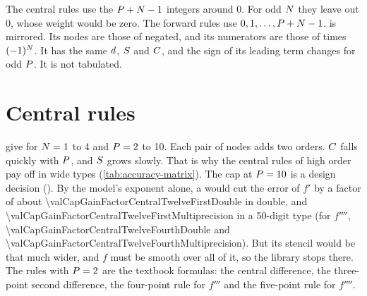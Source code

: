The central rules use the $P + N - 1$ integers around 0. For odd $N$ they leave out 0, whose weight
would be zero. The forward rules use $0, 1, \ldots, P + N - 1$.  is 
mirrored. Its nodes are those of  negated, and its numerators are those of  times
$(-1)^{N}$. It has the same $d$, $S$ and $C$, and the sign of its leading term changes for odd
$P$. It is not tabulated.

\section{Central rules}\label{sec:tables-central}

give  for $N = 1$ to 4 and $P = 2$ to 10. Each pair of nodes adds two orders. $C$
falls quickly with $P$, and $S$ grows slowly. That is why the central rules of high order pay off in wide
types (\cref{tab:accuracy-matrix}). The cap at $P = 10$ is a design decision
(). By the model's exponent alone, a  would cut the error of $f'$ by a
factor of about \num{\valCapGainFactorCentralTwelveFirstDouble} in double, and
\num{\valCapGainFactorCentralTwelveFirstMultiprecision} in a 50-digit type (for $f''''$,
\num{\valCapGainFactorCentralTwelveFourthDouble} and \num{\valCapGainFactorCentralTwelveFourthMultiprecision}). But
its stencil would be that much wider, and $f$ must be smooth over all of it, so the library stops there. The rules
with $P = 2$ are the textbook formulas: the central difference, the three-point second difference, the
four-point rule for $f'''$ and the five-point rule for $f''''$.

\begin{table}
\caption{ for the first derivative, $f'$.\label{tab:weights-central-first}}
\weighttablestart
{}
\weighttableend
\end{table}

\begin{table}
\caption{ for the second derivative, $f''$.\label{tab:weights-central-second}}
\weighttablestart
{}
\weighttableend
\end{table}

\begin{table}
\caption{ for the third derivative, $f'''$.\label{tab:weights-central-third}}
\weighttablestart
{}
\weighttableend
\end{table}

